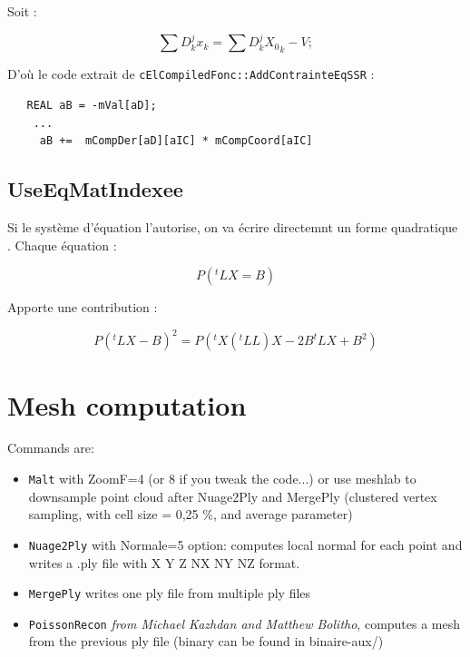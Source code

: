 Soit  :

\begin{equation}
    \sum{D^j_k x_k} =   \sum{D^j_k {X_0}_k} -V;
\end{equation}

D'o\`u le code extrait de {\tt cElCompiledFonc::AddContrainteEqSSR} :

\begin{verbatim}
   REAL aB = -mVal[aD];
    ...
	 aB +=  mCompDer[aD][aIC] * mCompCoord[aIC]
\end{verbatim}


\subsection{UseEqMatIndexee}


Si le syst\`eme d'\'equation l'autorise, on va \'ecrire directemnt un forme
quadratique . Chaque \'equation :

\begin{equation}
    P (^t L  X =  B)
\end{equation}

Apporte une contribution :

\begin{equation}
    P (^t L  X -  B) ^2  = P (^t X (^tLL)X  -2B^tL X + B^2)
\end{equation}

\section{Mesh computation}

Commands are:

\begin{itemize}
\item {\tt Malt} with ZoomF=4 (or 8 if you tweak the code...) or use meshlab to downsample point cloud after Nuage2Ply and MergePly (clustered vertex sampling, with cell size = 0,25 \%, and average parameter)
\item {\tt Nuage2Ply} with Normale=5 option: computes local normal for each point and writes a .ply file with X Y Z NX NY NZ format.
\item {\tt MergePly} writes one ply file from multiple ply files
\item {\tt PoissonRecon} {\it from Michael Kazhdan and Matthew Bolitho}, computes a mesh from the previous ply file (binary can be found in binaire-aux/)

\end{itemize}

